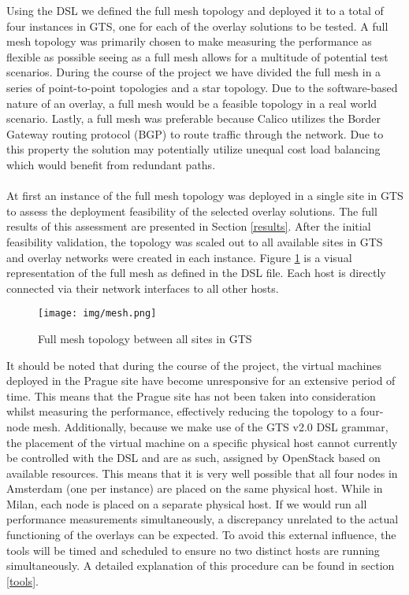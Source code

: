Using the DSL we defined the full mesh topology and deployed it to a total of four instances in GTS, one for each of the overlay solutions to be tested. A full mesh topology was primarily chosen to make measuring the performance as flexible as possible seeing as a full mesh allows for a multitude of potential test scenarios. During the course of the project we have divided the full mesh in a series of point-to-point topologies and a star topology. Due to the software-based nature of an overlay, a full mesh would be a feasible topology in a real world scenario. Lastly, a full mesh was preferable because Calico utilizes the Border Gateway routing protocol (BGP) to route traffic through the network. Due to this property the solution may potentially utilize unequal cost load balancing which would benefit from redundant paths. 
\\ \\
At first an instance of the full mesh topology was deployed in a single site in GTS to assess the deployment feasibility of the selected overlay solutions. The full results of this assessment are presented in Section \ref{results}. After the initial feasibility validation, the topology was scaled out to all available sites in GTS and overlay networks were created in each instance. Figure \ref{fig:gts_topology} is a visual representation of the full mesh as defined in the DSL file. Each host is directly connected via their network interfaces to all other hosts. 

\begin{figure}[!ht]
   \centering
   \texttt{[image: img/mesh.png]}
   \caption{Full mesh topology between all sites in GTS}
   \label{fig:gts_topology}
\end{figure}

It should be noted that during the course of the project, the virtual machines deployed in the Prague site have become unresponsive for an extensive period of time. This means that the Prague site has not been taken into consideration whilst measuring the performance, effectively reducing the topology to a four-node mesh. Additionally, because we make use of the GTS v2.0 DSL grammar, the placement of the virtual machine on a specific physical host cannot currently be controlled with the DSL and are as such, assigned by OpenStack based on available resources. This means that it is very well possible that all four nodes in Amsterdam (one per instance) are placed on the same physical host. While in Milan, each node is placed on a separate physical host. If we would run all performance measurements simultaneously, a discrepancy unrelated to the actual functioning of the overlays can be expected. To avoid this external influence, the tools will be timed and scheduled to ensure no two distinct hosts are running simultaneously. A detailed explanation of this procedure can be found in section \ref{tools}.

